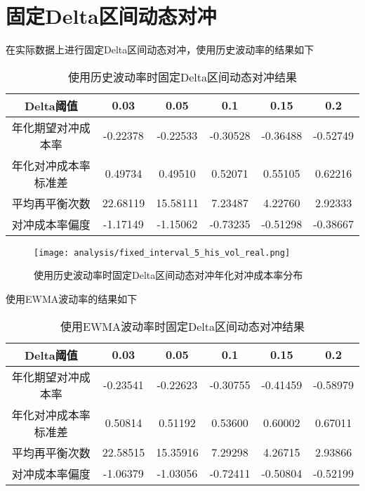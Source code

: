 \section{固定Delta区间动态对冲}

在实际数据上进行固定Delta区间动态对冲，使用历史波动率的结果如下

\begin{table}[htbp]
  \centering
  \caption{使用历史波动率时固定Delta区间动态对冲结果}
  \label{tab:fixed_interval_5_his_vol_real}
  \begin{tabular}{cccccc}
    \toprule
    Delta阈值 & 0.03 & 0.05 & 0.1 & 0.15 & 0.2 \\
    \midrule
    年化期望对冲成本率 & -0.22378 & -0.22533 & -0.30528 & -0.36488 & -0.52749 \\
    年化对冲成本率标准差 & 0.49734 & 0.49510 & 0.52071 & 0.55105 & 0.62216 \\
    平均再平衡次数 & 22.68119 & 15.58111 & 7.23487 & 4.22760 & 2.92333 \\
    对冲成本率偏度 & -1.17149 & -1.15062 & -0.73235 & -0.51298 & -0.38667 \\
    \bottomrule
  \end{tabular}
\end{table}

\begin{figure}[htb]
  \centering
  \texttt{[image: analysis/fixed\_interval\_5\_his\_vol\_real.png]}
  \caption[这里将出现在插图索引中]
    {使用历史波动率时固定Delta区间动态对冲年化对冲成本率分布}
  \label{fig:fixed_interval_5_his_vol_real}
\end{figure}
使用EWMA波动率的结果如下

\begin{table}[htbp]
  \centering
  \caption{使用EWMA波动率时固定Delta区间动态对冲结果}
  \label{tab:fixed_interval_5_ewma_vol_real}
  \begin{tabular}{cccccc}
    \toprule
    Delta阈值 & 0.03 & 0.05 & 0.1 & 0.15 & 0.2 \\
    \midrule
    年化期望对冲成本率 & -0.23541 & -0.22623 & -0.30755 & -0.41459 & -0.58979 \\
    年化对冲成本率标准差 & 0.50814 & 0.51192 & 0.53600 & 0.60002 & 0.67011 \\
    平均再平衡次数 & 22.58515 & 15.35916 & 7.29298 & 4.26715 & 2.93866 \\
    对冲成本率偏度 & -1.06379 & -1.03056 & -0.72411 & -0.50804 & -0.52199 \\
    \bottomrule
  \end{tabular}
\end{table}

